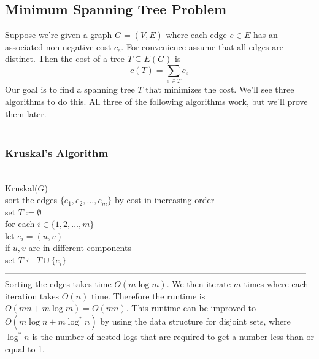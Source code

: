 \documentclass{article}
\newcommand{\emp}{\emptyset}
\begin{document}
\subsection{Minimum Spanning Tree Problem}
Suppose we're given a graph $G = (V, E)$ where each edge $e \in E$ has an associated non-negative cost $c_e$. For convenience assume that all edges are distinct. Then the cost of a tree $T \subseteq E(G)$ is
\[c(T) = \sum_{e \in T}c_e\]
Our goal is to find a spanning tree $T$ that minimizes the cost. We'll see three algorithms to do this. All three of the following algorithms work, but we'll prove them later.\\\\
\subsubsection{Kruskal's Algorithm}
---------------------------------------------------------------------------------------------------------
Kruskal($G$)\\
	\hspace*{7mm} sort the edges $\{e_1, e_2, \dots, e_m\}$ by cost in increasing order\\
	\hspace*{7mm} set $T := \emp$\\
	\hspace*{7mm} for each $i \in \{1, 2, \dots, m\}$\\
	\hspace*{14mm} let $e_i = (u, v)$\\
	\hspace*{14mm} if $u, v$ are in different components\\
	\hspace*{21mm} set $T \leftarrow T \cup \{e_i\}$\\
---------------------------------------------------------------------------------------------------------\\
Sorting the edges takes time $O(m \log m)$. We then iterate $m$ times where each iteration takes $O(n)$ time. Therefore the runtime is $O(mn + m \log m) = O(mn)$. This runtime can be improved to $O(m \log n + m \log^* n)$ by using the data structure for disjoint sets, where $\log^*n$ is the number of nested logs that are required to get a number less than or equal to 1.
\end{document}
